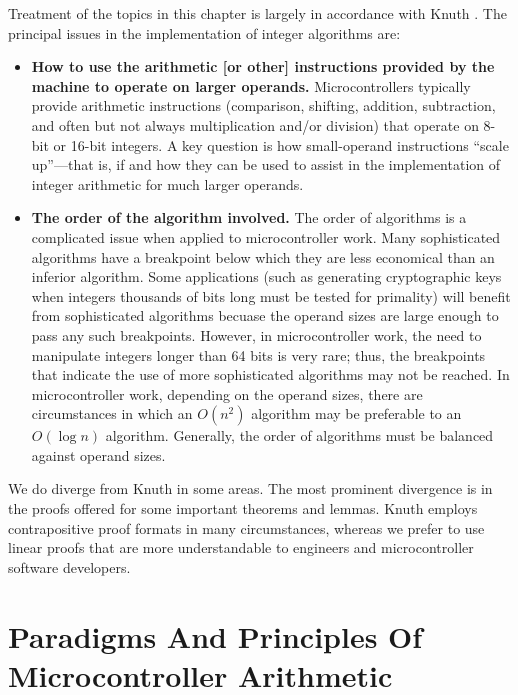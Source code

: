 Treatment of the topics in this chapter is largely in accordance with
Knuth \cite{bibref:b:knuthclassic2ndedvol2}.  The principal issues in 
the implementation of integer algorithms are:

\begin{itemize}
\item \textbf{How to use the arithmetic [or other] instructions provided by the machine to
      operate on larger operands.}  Microcontrollers typically provide arithmetic
      instructions (comparison, shifting, addition, subtraction, and often but not
      always multiplication and/or division) that operate on 8-bit or 16-bit integers.  
      A key question
      is how small-operand instructions ``scale up''---that is, if and how they can
      be used to assist in the implementation of integer arithmetic for much larger 
      operands.
\item \textbf{The order of the algorithm involved.}  The order of algorithms
      is a complicated issue when applied to microcontroller work.  Many sophisticated
      algorithms have a breakpoint below which they are less economical than
      an inferior algorithm.  Some applications (such as generating cryptographic keys
      when integers thousands of bits long must be tested for primality) will
      benefit from sophisticated algorithms becuase the operand sizes are large enough
      to pass any such breakpoints.  However, in microcontroller work, the need to manipulate
      integers longer than 64 bits is very rare; thus, the breakpoints that indicate the
      use of more sophisticated algorithms may not be reached.  In microcontroller work,
      depending on the operand sizes, there are circumstances in which an
      $O(n^2)$ algorithm may be preferable to an $O(\log n)$ algorithm.  Generally,
      the order of algorithms must be balanced against operand sizes.
\end{itemize}

We do diverge from Knuth in some areas.  The most prominent divergence is
in the proofs offered for some important theorems and lemmas.  Knuth 
employs contrapositive proof formats in many circumstances, whereas we prefer
to use linear proofs that are more understandable to engineers and microcontroller
software developers.

\section[Paradigms And Principles]
        {Paradigms And Principles Of Microcontroller Arithmetic}
\label{ccil0:sppm0}

